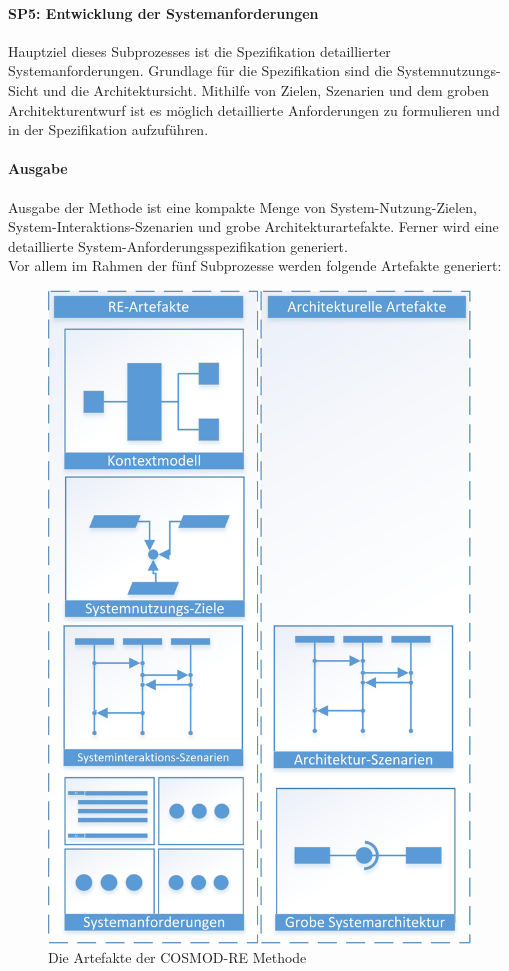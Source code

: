 \paragraph{SP5: Entwicklung der Systemanforderungen}
Hauptziel dieses Subprozesses ist die Spezifikation detaillierter Systemanforderungen. Grundlage für die Spezifikation sind die Systemnutzungs-Sicht und die Architektursicht. Mithilfe von Zielen, Szenarien und dem groben Architekturentwurf ist es möglich detaillierte Anforderungen zu formulieren und in der Spezifikation aufzuführen.\\

\paragraph{Ausgabe}
Ausgabe der Methode ist eine kompakte Menge von System-Nutzung-Zielen, System-Interaktions-Szenarien und grobe Architekturartefakte. Ferner wird eine detaillierte System-Anforderungsspezifikation generiert.\\

Vor allem im Rahmen der fünf Subprozesse werden folgende Artefakte generiert:\\

\begin{figure}[h]
	\centering
	\includegraphics[scale=0.8]{artefakte.jpg} 
	\caption{Die Artefakte der COSMOD-RE Methode}\label{art}
\end{figure}

